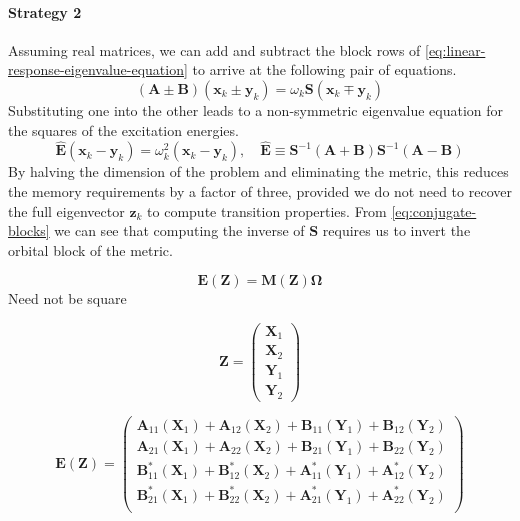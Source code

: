 \paragraph{Strategy 2}
Assuming real matrices, we can add and subtract the block rows of
\cref{eq:linear-response-eigenvalue-equation} to arrive at the following pair of
equations.
\begin{equation}
    (\mathbf{A} \pm \mathbf{B})
    (\mathbf{x}_k  \pm \mathbf{y}_k)
    =
    \omega_k
    \mathbf{S}
    (\mathbf{x}_k \mp \mathbf{y}_k)
\end{equation}
Substituting one into the other leads to a non-symmetric eigenvalue equation for
the squares of the excitation energies.
\begin{equation}
    \widehat{\mathbf{E}}
    (\mathbf{x}_k - \mathbf{y}_k)
    =
    \omega_k^2
    (\mathbf{x}_k - \mathbf{y}_k)
    ,
    \quad
    \widehat{\mathbf{E}}
    \equiv
    \mathbf{S}^{-1}
    (\mathbf{A} + \mathbf{B})
    \mathbf{S}^{-1}
    (\mathbf{A} - \mathbf{B})
\end{equation}
By halving the dimension of the problem and eliminating the metric, this reduces
the memory requirements by a factor of three, provided we do not need to recover
the full eigenvector \(\mathbf{z}_k\) to compute transition properties.
From \cref{eq:conjugate-blocks} we can see that computing the inverse of
\(\mathbf{S}\) requires us to invert the orbital block of the metric.


\begin{equation}
    \mathbf{E}(\mathbf{Z})
    =
    \mathbf{M}(\mathbf{Z})
    \boldsymbol{\Omega}
\end{equation}
Need not be square

\begin{equation}
    \mathbf{Z}
    =
    \begin{pmatrix}
        \mathbf{X}_1 \\
        \mathbf{X}_2 \\
        \mathbf{Y}_1 \\
        \mathbf{Y}_2
    \end{pmatrix}
\end{equation}

\begin{equation}
    \mathbf{E}(\mathbf{Z})
    =
    \begin{pmatrix}
        \mathbf{A}_{11}(\mathbf{X}_1) +
        \mathbf{A}_{12}(\mathbf{X}_2) +
        \mathbf{B}_{11}(\mathbf{Y}_1) +
        \mathbf{B}_{12}(\mathbf{Y}_2) \\
        \mathbf{A}_{21}(\mathbf{X}_1) +
        \mathbf{A}_{22}(\mathbf{X}_2) +
        \mathbf{B}_{21}(\mathbf{Y}_1) +
        \mathbf{B}_{22}(\mathbf{Y}_2) \\
        \mathbf{B}^*_{11}(\mathbf{X}_1) +
        \mathbf{B}^*_{12}(\mathbf{X}_2) +
        \mathbf{A}^*_{11}(\mathbf{Y}_1) +
        \mathbf{A}^*_{12}(\mathbf{Y}_2) \\
        \mathbf{B}^*_{21}(\mathbf{X}_1) +
        \mathbf{B}^*_{22}(\mathbf{X}_2) +
        \mathbf{A}^*_{21}(\mathbf{Y}_1) +
        \mathbf{A}^*_{22}(\mathbf{Y}_2) \\
    \end{pmatrix}
\end{equation}


